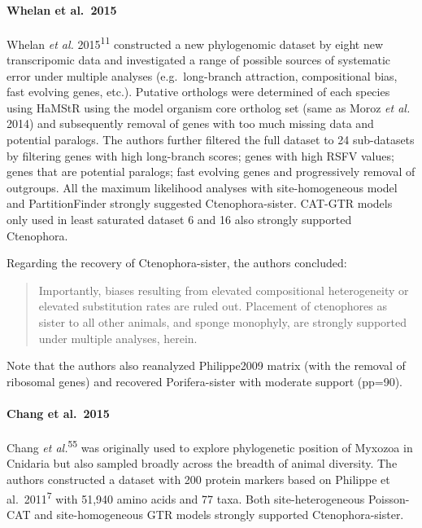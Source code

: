 \documentclass[]{article}
\let\oldparagraph\paragraph
\renewcommand{\paragraph}[1]{\oldparagraph{#1}\mbox{}}
\begin{document}
\hypertarget{whelan-et-al.2015}{%
\paragraph{Whelan et al.~2015}\label{whelan-et-al.2015}}

Whelan \emph{et al.} 2015\textsuperscript{11} constructed a new
phylogenomic dataset by eight new transcripomic data and investigated a
range of possible sources of systematic error under multiple analyses
(e.g.~long-branch attraction, compositional bias, fast evolving genes,
etc.). Putative orthologs were determined of each species using HaMStR
using the model organism core ortholog set (same as Moroz \emph{et al.}
2014) and subsequently removal of genes with too much missing data and
potential paralogs. The authors further filtered the full dataset to 24
sub-datasets by filtering genes with high long-branch scores; genes with
high RSFV values; genes that are potential paralogs; fast evolving genes
and progressively removal of outgroups. All the maximum likelihood
analyses with site-homogeneous model and PartitionFinder strongly
suggested Ctenophora-sister. CAT-GTR models only used in least saturated
dataset 6 and 16 also strongly supported Ctenophora.

Regarding the recovery of Ctenophora-sister, the authors concluded:

\begin{quote}
Importantly, biases resulting from elevated compositional heterogeneity
or elevated substitution rates are ruled out. Placement of ctenophores
as sister to all other animals, and sponge monophyly, are strongly
supported under multiple analyses, herein.
\end{quote}

Note that the authors also reanalyzed Philippe2009 matrix (with the
removal of ribosomal genes) and recovered Porifera-sister with moderate
support (pp=90).

\hypertarget{chang-et-al.2015}{%
\paragraph{Chang et al.~2015}\label{chang-et-al.2015}}

Chang \emph{et al.}\textsuperscript{55} was originally used to explore
phylogenetic position of Myxozoa in Cnidaria but also sampled broadly
across the breadth of animal diversity. The authors constructed a
dataset with 200 protein markers based on Philippe et
al.~2011\textsuperscript{7} with 51,940 amino acids and 77 taxa. Both
site-heterogeneous Poisson-CAT and site-homogeneous GTR models strongly
supported Ctenophora-sister.
\end{document}
